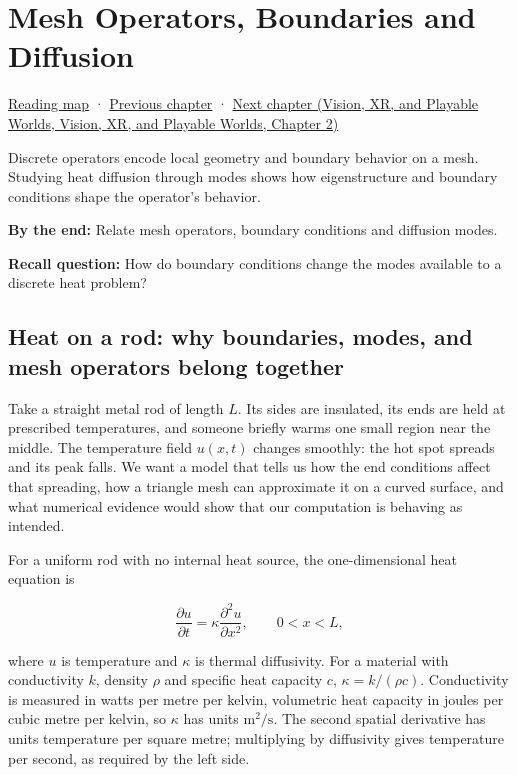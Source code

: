 \hypertarget{04-visual-computing-ii-ch030}{}
\chapter{Mesh Operators, Boundaries and Diffusion}\label{stagechapter:04-visual-computing-ii-ch030}\label{04-visual-computing-ii-ch030-mesh-operators-boundaries-and-diffusion}

\hyperref[volume-reading-map]{Reading map} · \hyperref[04-visual-computing-ii-ch029-acceleration-structures-and-robust-queries]{Previous chapter} · \href{../07-Vision-XR-and-Playable-Worlds/main.pdf\#nameddest=04-visual-computing-ii-ch031-learning-a-visual-classifier}{Next chapter (Vision, XR, and Playable Worlds, Vision, XR, and Playable Worlds, Chapter 2)}

Discrete operators encode local geometry and boundary behavior on a mesh. Studying heat diffusion through modes shows how eigenstructure and boundary conditions shape the operator's behavior.

\textbf{By the end:} Relate mesh operators, boundary conditions and diffusion modes.

\textbf{Recall question:} How do boundary conditions change the modes available to a discrete heat problem?

\section{Heat on a rod: why boundaries, modes, and mesh operators belong together}\label{04-visual-computing-ii-ch030-heat-on-a-rod-why-boundaries-modes-and-mesh-operators-belong-together}

Take a straight metal rod of length \(L\). Its sides are insulated, its ends are held at prescribed temperatures, and someone briefly warms one small region near the middle. The temperature field \(u(x,t)\) changes smoothly: the hot spot spreads and its peak falls. We want a model that tells us how the end conditions affect that spreading, how a triangle mesh can approximate it on a curved surface, and what numerical evidence would show that our computation is behaving as intended.

For a uniform rod with no internal heat source, the one-dimensional heat equation is

\[
\frac{\partial u}{\partial t}=\kappa\frac{\partial^2u}{\partial x^2},\qquad 0<x<L,
\]

where \(u\) is temperature and \(\kappa\) is thermal diffusivity. For a material with conductivity \(k\), density \(\rho\) and specific heat capacity \(c\), \(\kappa=k/(\rho c)\). Conductivity is measured in watts per metre per kelvin, volumetric heat capacity in joules per cubic metre per kelvin, so \(\kappa\) has units \(\mathrm{m^2/s}\). The second spatial derivative has units temperature per square metre; multiplying by diffusivity gives temperature per second, as required by the left side.

